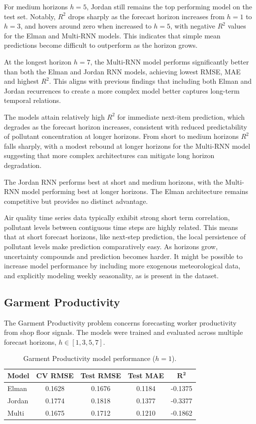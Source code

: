 \documentclass[conference]{IEEEtran}
\begin{document}
For medium horizons $h=5$, Jordan still remains the top performing model on the test set. Notably, $R^2$ drops sharply as the forecast horizon increases from $h=1$ to $h=3$, and hovers around zero when increased to $h=5$, with negative $R^2$ values for the Elman and Multi-RNN models. This indicates that simple mean predictions become difficult to outperform as the horizon grows.

At the longest horizon $h=7$, the Multi-RNN model performs significantly better than both the Elman and Jordan RNN models, achieving lowest RMSE, MAE and highest $R^2$. This aligns with previous findings that including both Elman and Jordan recurrences to create a more complex model better captures long-term temporal relations.

The models attain relatively high $R^2$ for immediate next-item prediction, which degrades as the forecast horizon increases, consistent with reduced predictability of pollutant concentration at longer horizons. From short to medium  horizons $R^2$ falls sharply, with a modest rebound at longer horizons for the Multi-RNN model suggesting that more complex architectures can mitigate long horizon degradation.

The Jordan RNN performs best at short and medium horizons, with the Multi-RNN model performing best at longer horizons. The Elman architecture remains competitive but provides no distinct advantage.

Air quality time series data typically exhibit strong short term correlation, pollutant levels between contiguous time steps are highly related. This means that at short forecast horizons, like next-step prediction, the local persistence of pollutant levels make prediction comparatively easy. As horizons grow, uncertainty compounds and prediction becomes harder. It might be possible to increase model performance by including more exogenous meteorological data, and explicitly modeling weekly seasonality, as is present in the dataset. 

\subsection{\textbf{Garment Productivity}}
The Garment Productivity problem concerns forecasting worker productivity from shop floor signals. The models were trained and evaluated across multiple forecast horizons, $h \in [1,3,5,7]$.

\begin{table}[H]
\centering
\caption{Garment Productivity model performance ($h=1$).}
\label{tab:gp_h1}
\begin{tabular}{lcccc}
\toprule
\textbf{Model} & \textbf{CV RMSE} & \textbf{Test RMSE} & \textbf{Test MAE} & $\mathbf{R^2}$ \\
\midrule
Elman  & 0.1628 & 0.1676 & 0.1184 & -0.1375 \\
Jordan & 0.1774 & 0.1818 & 0.1377 & -0.3377 \\
Multi  & 0.1675 & 0.1712 & 0.1210 & -0.1862 \\
\bottomrule
\end{tabular}
\end{table}
\end{document}
